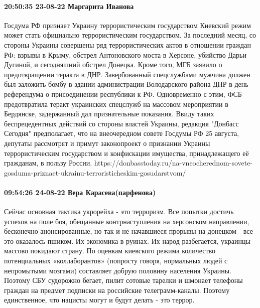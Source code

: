  
 
 
 
 

\paragraph{20:50:35 23-08-22 Маргарита Иванова}

Госдума РФ признает Украину террористическим государством
Киевский режим может стать официально террористическим государством. За последний месяц, со стороны Украины совершены ряд террористических актов в отношении граждан РФ: взрывы в Крыму, обстрел Антоновского моста в Херсоне, убийство Дарьи Дугиной, и сегодняшний обстрел Донецка.
Кроме того, МГБ заявило о предотвращении теракта в ДНР. Завербованный спецслужбами мужчина должен был заложить бомбу в здании администрации Володарского района ДНР в день референдума о присоединении республики к РФ. Одновременно с этим, ФСБ предотвратила теракт украинских спецслужб на массовом мероприятии в Бердянске, задержанный дал признательные показания.
Ввиду таких беспрецедентных действий со стороны властей Украины, редакция "Донбасс Сегодня" предполагает, что на внеочередном совете Госдумы РФ 25 августа, депутаты рассмотрят и примут законопроект о признании Украины террористическим государством и конфискации имущества, принадлежащего её гражданам, в пользу России.
https://donbasstoday.ru/na-vneocherednom-sovete-gosduma-priznaet-ukrainu-terroristicheskim-gosudarstvom/

\paragraph{09:54:26 24-08-22 Вера Карасева(парфенова)}

Сейчас основная тактика укрорейха - это терроризм. Все попытки достичь успехов на поле боя, обещанные контрнаступления на херсонском направлении, бесконечно анонсированные, но так и не начавшиеся прорывы на донецком - все это оказалось пшиком.
Их экономика в руинах. Их народ разбегается, украинцы массово покидают страну. По оценкам киевского режима количество потенциальных «коллаборантов» (попросту говоря, нормальных людей с непромытыми мозгами) составляет добрую половину населения Украины. Поэтому СБУ судорожно бегает, пилит сотовые тарелки и шмонает телефоны граждан на предмет подписки на российские телеграмм-каналы.
Поэтому единственное, что нацисты могут и будут делать - это террор.

